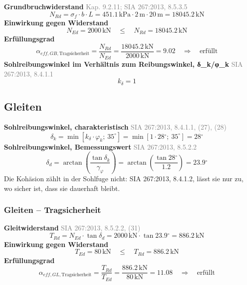 \documentclass[11pt,a4paper]{article}
\newcommand{\normref}[1]{{\small\textcolor{gray}{#1}}}
\begin{document}
\noindent\textbf{Grundbruchwiderstand} \hfill \normref{Kap. 9.2.11; SIA 267:2013, 8.5.3.5}
\begin{equation*}
N_{Rd} = \sigma_f \cdot b \cdot L = 451.1\,\mathrm{kPa} \cdot 2\,\mathrm{m} \cdot 20\,\mathrm{m} = 18045.2\,\mathrm{kN}
\end{equation*}
\noindent\textbf{Einwirkung gegen Widerstand}
\begin{equation*}
N_{Ed} = 2000\,\mathrm{kN} \quad \le \quad N_{Rd} = 18045.2\,\mathrm{kN}
\end{equation*}
\noindent\textbf{Erfüllungsgrad}
\begin{equation*}
\alpha_{eff,GB,\text{Tragsicherheit}} = \frac{N_{Rd}}{N_{Ed}} = \frac{18045.2\,\mathrm{kN}}{2000\,\mathrm{kN}} = 9.02 \quad \Rightarrow \quad \text{erfüllt}
\end{equation*}
\noindent\textbf{Sohlreibungswinkel im Verhältnis zum Reibungswinkel, δ\_k/φ\_k} \hfill \normref{SIA 267:2013, 8.4.1.1}
\begin{equation*}
k_{\delta} = 1
\end{equation*}
\subsection{Gleiten}
\noindent\textbf{Sohlreibungswinkel, charakteristisch} \hfill \normref{SIA 267:2013, 8.4.1.1, (27), (28)}
\begin{equation*}
\delta_k = \min\left[k_{\delta} \cdot \varphi_k;\ 35^\circ\right] = \min\left[1 \cdot 28{}^{\circ};\ 35^\circ\right] = 28{}^{\circ}
\end{equation*}
\noindent\textbf{Sohlreibungswinkel, Bemessungswert} \hfill \normref{SIA 267:2013, 8.5.2.2}
\begin{equation*}
\delta_d = \arctan\left(\frac{\tan \delta_k}{\gamma_{\varphi}}\right) = \arctan\left(\frac{\tan 28{}^{\circ}}{1.2}\right) = 23.9{}^{\circ}
\end{equation*}
Die Kohäsion zählt in der Sohlfuge nicht: SIA 267:2013, 8.4.1.2, lässt sie nur zu, wo sicher ist, dass sie dauerhaft bleibt.

\subsubsection{Gleiten – Tragsicherheit}
\noindent\textbf{Gleitwiderstand} \hfill \normref{SIA 267:2013, 8.5.2.2, (31)}
\begin{equation*}
T_{Rd} = N_{Ed} \cdot \tan \delta_d = 2000\,\mathrm{kN} \cdot \tan 23.9{}^{\circ} = 886.2\,\mathrm{kN}
\end{equation*}
\noindent\textbf{Einwirkung gegen Widerstand}
\begin{equation*}
T_{Ed} = 80\,\mathrm{kN} \quad \le \quad T_{Rd} = 886.2\,\mathrm{kN}
\end{equation*}
\noindent\textbf{Erfüllungsgrad}
\begin{equation*}
\alpha_{eff,GL,\text{Tragsicherheit}} = \frac{T_{Rd}}{T_{Ed}} = \frac{886.2\,\mathrm{kN}}{80\,\mathrm{kN}} = 11.08 \quad \Rightarrow \quad \text{erfüllt}
\end{equation*}
\end{document}
